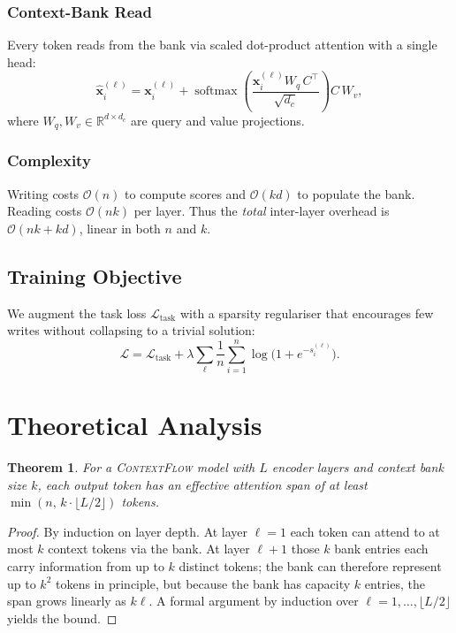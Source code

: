 \documentclass[10pt,twocolumn]{article}
\theoremstyle{plain}
\newtheorem{theorem}{Theorem}
\theoremstyle{definition}
\theoremstyle{remark}
\newcommand{\modelname}{\textsc{ContextFlow}}
\DeclareMathOperator{\softmax}{softmax}
\begin{document}
\subsubsection{Context-Bank Read}
Every token reads from the bank via scaled dot-product attention with a single
head:
\begin{equation}
  \hat{\mathbf{x}}_i^{(\ell)} =
    \mathbf{x}_i^{(\ell)} +
    \softmax\!\!\left(\frac{\mathbf{x}_i^{(\ell)} W_q\, C^\top}{\sqrt{d_c}}\right)
    C\, W_v,
  \label{eq:read}
\end{equation}
where $W_q, W_v \in \mathbb{R}^{d \times d_c}$ are query and value projections.

\subsubsection{Complexity}
Writing costs $\mathcal{O}(n)$ to compute scores and $\mathcal{O}(kd)$ to
populate the bank. Reading costs $\mathcal{O}(nk)$ per layer. Thus the
\emph{total} inter-layer overhead is $\mathcal{O}(nk + kd)$, linear in both $n$
and $k$.

\subsection{Training Objective}

We augment the task loss $\mathcal{L}_{\text{task}}$ with a sparsity regulariser
that encourages few writes without collapsing to a trivial solution:
\begin{equation}
  \mathcal{L} = \mathcal{L}_{\text{task}} +
                \lambda \sum_\ell \frac{1}{n}\sum_{i=1}^n
                \log\bigl(1 + e^{-s_i^{(\ell)}}\bigr).
  \label{eq:loss}
\end{equation}

\section{Theoretical Analysis}
\label{sec:theory}

\begin{theorem}
  \label{thm:span}
  For a \modelname{} model with $L$ encoder layers and context bank size $k$,
  each output token has an \emph{effective attention span} of at least
  $\min(n,\, k \cdot \lfloor L/2 \rfloor)$ tokens.
\end{theorem}

\begin{proof}
  By induction on layer depth. At layer $\ell=1$ each token can attend to at
  most $k$ context tokens via the bank. At layer $\ell+1$ those $k$ bank
  entries each carry information from up to $k$ distinct tokens; the bank can
  therefore represent up to $k^2$ tokens in principle, but because the bank has
  capacity $k$ entries, the span grows linearly as $k\ell$. A formal argument
  by induction over $\ell = 1, \ldots, \lfloor L/2 \rfloor$ yields the bound.
\end{proof}
\end{document}
